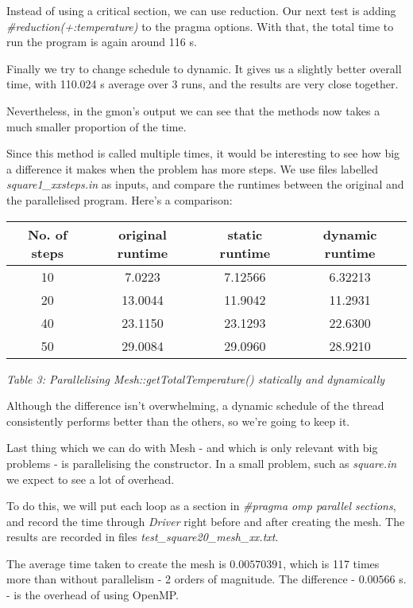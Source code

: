 \documentclass[11pt,journal]{IEEEtran}
\begin{document}
	Instead of using a critical section, we can use reduction. Our next test is adding \emph{\#reduction(+:temperature)} to the pragma options. With that, the total time to run the program is again around 116 s.
	
	Finally we try to change schedule to dynamic. It gives us a slightly better overall time, with 110.024 s average over 3 runs, and the results are very close together.
	
	Nevertheless, in the gmon's output we can see that the methods now takes a much smaller proportion of the time.
	
	Since this method is called multiple times, it would be interesting to see how big a difference it makes when the problem has more steps. We use files labelled \emph{square1\_xxsteps.in} as inputs, and compare the runtimes between the original and the parallelised program. Here's a comparison:
	
	\begin{table}[h]
		\centering
		\begin{tabular}{|c|c|c|c|}
			\hline
			No. of steps & original runtime & static runtime& dynamic runtime \\
			\hline
			10 & 7.0223 & 7.12566 & 6.32213 \\
			\hline
			20 & 13.0044 & 11.9042 & 11.2931 \\
			\hline
			40 & 23.1150 & 23.1293 & 22.6300 \\
			\hline
			50 & 29.0084 & 29.0960 & 28.9210 \\
			\hline
		\end{tabular}
	
	\emph{Table 3: Parallelising Mesh::getTotalTemperature() statically and dynamically}
	\end{table}

	Although the difference isn't overwhelming, a dynamic schedule of the thread consistently performs better than the others, so we're going to keep it.
	
	Last thing which we can do with Mesh - and which is only relevant with big problems - is parallelising the constructor. In a small problem, such as \emph{square.in} we expect to see a lot of overhead. 
	
	To do this, we will put each loop as a section in \emph{\#pragma omp parallel sections}, and record the time through \emph{Driver} right before and after creating the mesh. The results are recorded in files \emph{test\_square20\_mesh\_xx.txt}.
	
	The average time taken to create the mesh is $0.00570391$, which is 117 times more than without parallelism - 2 orders of magnitude. The difference - $0.00566$ s. - is the overhead of using OpenMP.
	
\end{document}
